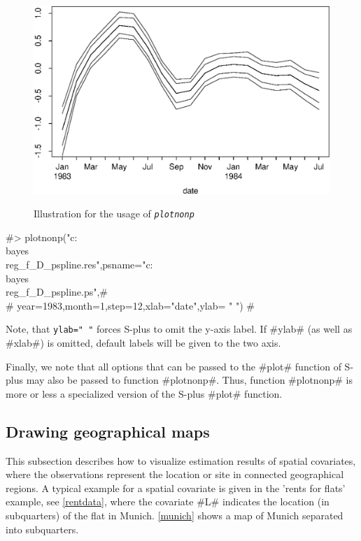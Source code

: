 \begin{figure}[ht]
\begin{center}
\includegraphics[scale=0.8]{grafiken/plotnonpdate.eps}
{\em\caption{ \label{illgraph2} Illustration for the usage of
\em\tt plotnonp}}
\end{center}
\end{figure}

#> plotnonp("c:\\bayes\\reg_f_D_pspline.res",psname="c:\\bayes\\reg_f_D_pspline.ps",#\\
#  year=1983,month=1,step=12,xlab="date",ylab= " ") #

Note, that \texttt{ylab=" "} forces S-plus to omit the y-axis label.
If #ylab# (as well as #xlab#) is omitted, default labels will be
given to the two axis.

Finally, we note that all options that can be passed to the #plot#
function of S-plus may also be passed to function #plotnonp#.
Thus, function #plotnonp# is more or less a specialized version of
the S-plus #plot# function.


\subsection{Drawing geographical maps}  

This subsection describes how to visualize estimation results of
spatial covariates, where the observations represent the location
or site in connected geographical regions. A typical example for a
spatial covariate is given in the 'rents for flats' example, see
\autoref{rentdata}, where the covariate #L# indicates the location
(in subquarters) of the flat in Munich. \autoref{munich} shows a
map of Munich separated into subquarters.

